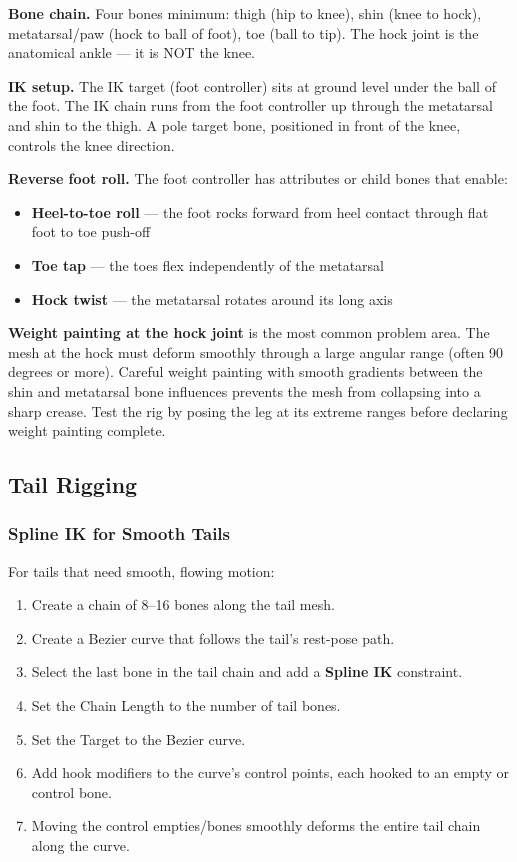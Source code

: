 \textbf{Bone chain.} Four bones minimum: thigh (hip to knee), shin (knee to hock), metatarsal/paw (hock to ball of foot), toe (ball to tip). The hock joint is the anatomical ankle --- it is NOT the knee.

\textbf{IK setup.} The IK target (foot controller) sits at ground level under the ball of the foot. The IK chain runs from the foot controller up through the metatarsal and shin to the thigh. A pole target bone, positioned in front of the knee, controls the knee direction.

\textbf{Reverse foot roll.} The foot controller has attributes or child bones that enable:
\begin{itemize}[leftmargin=2em]
  \item \textbf{Heel-to-toe roll} --- the foot rocks forward from heel contact through flat foot to toe push-off
  \item \textbf{Toe tap} --- the toes flex independently of the metatarsal
  \item \textbf{Hock twist} --- the metatarsal rotates around its long axis
\end{itemize}

\begin{warningbox}
\textbf{Weight painting at the hock joint} is the most common problem area. The mesh at the hock must deform smoothly through a large angular range (often 90 degrees or more). Careful weight painting with smooth gradients between the shin and metatarsal bone influences prevents the mesh from collapsing into a sharp crease. Test the rig by posing the leg at its extreme ranges before declaring weight painting complete.
\end{warningbox}


\subsection{Tail Rigging}

\subsubsection{Spline IK for Smooth Tails}

For tails that need smooth, flowing motion:

\begin{enumerate}[leftmargin=2em]
  \item Create a chain of 8--16 bones along the tail mesh.
  \item Create a Bezier curve that follows the tail's rest-pose path.
  \item Select the last bone in the tail chain and add a \textbf{Spline IK} constraint.
  \item Set the Chain Length to the number of tail bones.
  \item Set the Target to the Bezier curve.
  \item Add hook modifiers to the curve's control points, each hooked to an empty or control bone.
  \item Moving the control empties/bones smoothly deforms the entire tail chain along the curve.
\end{enumerate}

